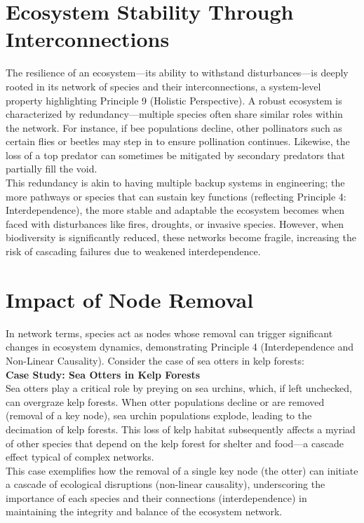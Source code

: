 \section{Ecosystem Stability Through Interconnections}
The resilience of an ecosystem—its ability to withstand disturbances—is deeply rooted in its network of species and their interconnections, a system-level property highlighting Principle 9 (Holistic Perspective). A robust ecosystem is characterized by redundancy—multiple species often share similar roles within the network. For instance, if bee populations decline, other pollinators such as certain flies or beetles may step in to ensure pollination continues. Likewise, the loss of a top predator can sometimes be mitigated by secondary predators that partially fill the void.\\[1ex]
This redundancy is akin to having multiple backup systems in engineering; the more pathways or species that can sustain key functions (reflecting Principle 4: Interdependence), the more stable and adaptable the ecosystem becomes when faced with disturbances like fires, droughts, or invasive species. However, when biodiversity is significantly reduced, these networks become fragile, increasing the risk of cascading failures due to weakened interdependence. %

\section{Impact of Node Removal}
In network terms, species act as nodes whose removal can trigger significant changes in ecosystem dynamics, demonstrating Principle 4 (Interdependence and Non-Linear Causality). Consider the case of sea otters in kelp forests:\\[1ex]
\textbf{Case Study: Sea Otters in Kelp Forests}\\[1ex]
Sea otters play a critical role by preying on sea urchins, which, if left unchecked, can overgraze kelp forests. When otter populations decline or are removed (removal of a key node), sea urchin populations explode, leading to the decimation of kelp forests. This loss of kelp habitat subsequently affects a myriad of other species that depend on the kelp forest for shelter and food—a cascade effect typical of complex networks.\\[1ex]
This case exemplifies how the removal of a single key node (the otter) can initiate a cascade of ecological disruptions (non-linear causality), underscoring the importance of each species and their connections (interdependence) in maintaining the integrity and balance of the ecosystem network. %

